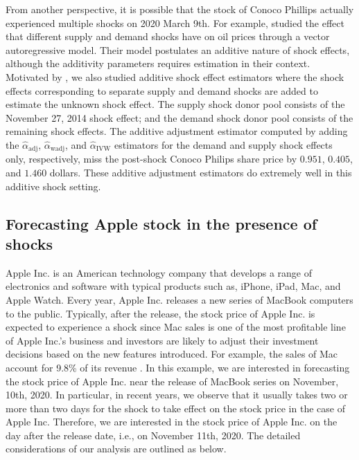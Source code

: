 \documentclass[11pt,3p,review,authoryear]{elsarticle}
\theoremstyle{definition}
\begin{document}
From another perspective, it is possible that the stock of Conoco Phillips actually experienced multiple shocks on 2020 March 9th. For example, \citet{kilian2009not} studied the effect that different supply and demand shocks have on oil prices through a vector autoregressive model. Their model postulates an additive nature of shock effects, although the additivity parameters requires estimation in their context. Motivated by \citet{kilian2009not}, we also studied additive shock effect estimators where the shock effects corresponding to separate supply and demand shocks are added to estimate the unknown shock effect. The supply shock donor pool consists of the November 27, 2014 shock effect; and the demand shock donor pool consists of the remaining shock effects. The additive adjustment estimator computed by adding the $\hat{\alpha}_{\text{adj}}$, $\hat{\alpha}_{\text{wadj}}$, and $\hat{\alpha}_{\text{IVW}}$ estimators for the demand and supply shock effects only, respectively, miss the post-shock Conoco Philips share price by $0.951$, $0.405$, and $1.460$ dollars. These additive adjustment estimators do extremely well in this additive shock setting. 

\subsection{Forecasting Apple stock in the presence of shocks}
\label{apple}

Apple Inc. is an American technology company that develops a range of electronics and software with typical products such as, iPhone, iPad, Mac, and Apple Watch. Every year, Apple Inc. releases a new series of MacBook computers to the public. Typically, after the release, the stock price of Apple Inc. is expected to experience a shock since Mac sales is one of the most profitable line of Apple Inc.'s business and investors are likely to adjust their investment decisions based on the new features introduced. For example, the sales of Mac account for 9.8\% of its revenue \citep{applemac}. In this example, we are interested in forecasting the stock price of Apple Inc. near the release of MacBook series on November, 10th, 2020. In particular, in recent years, we observe that it usually takes two or more than two days for the shock to take effect on the stock price in the case of Apple Inc. Therefore, we are interested in the stock price of Apple Inc. on the day after the release date, i.e., on November 11th, 2020. The detailed considerations of our analysis are outlined as below.
\end{document}
